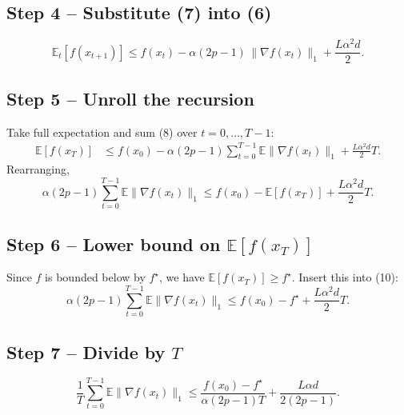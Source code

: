 \documentclass{article}
\begin{document}
\subsection*{Step 4 – Substitute (7) into (6)}
\[
\mathbb{E}_t[f(x_{t+1})]\le f(x_t)-\alpha(2p-1)\,\|\nabla f(x_t)\|_{1}
+\frac{L\alpha^{2}d}{2}. \tag{8}
\]

\subsection*{Step 5 – Unroll the recursion}
Take full expectation and sum (8) over $t=0,\dots,T-1$:
\[
\begin{aligned}
\mathbb{E}[f(x_T)] &\le f(x_0)-\alpha(2p-1)\sum_{t=0}^{T-1}\mathbb{E}\|\nabla f(x_t)\|_{1}
+\frac{L\alpha^{2}d}{2}T . \tag{9}
\end{aligned}
\]
Rearranging,
\[
\alpha(2p-1)\sum_{t=0}^{T-1}\mathbb{E}\|\nabla f(x_t)\|_{1}
\le f(x_0)-\mathbb{E}[f(x_T)]+\frac{L\alpha^{2}d}{2}T . \tag{10}
\]

\subsection*{Step 6 – Lower bound on $\mathbb{E}[f(x_T)]$}
Since $f$ is bounded below by $f^\star$, we have $\mathbb{E}[f(x_T)]\ge f^\star$.  Insert this into (10):
\[
\alpha(2p-1)\sum_{t=0}^{T-1}\mathbb{E}\|\nabla f(x_t)\|_{1}
\le f(x_0)-f^\star+\frac{L\alpha^{2}d}{2}T . \tag{11}
\]

\subsection*{Step 7 – Divide by $T$}
\[
\frac{1}{T}\sum_{t=0}^{T-1}\mathbb{E}\|\nabla f(x_t)\|_{1}
\le \frac{f(x_0)-f^\star}{\alpha(2p-1)T}
+\frac{L\alpha d}{2(2p-1)} . \tag{12}
\]
\end{document}
